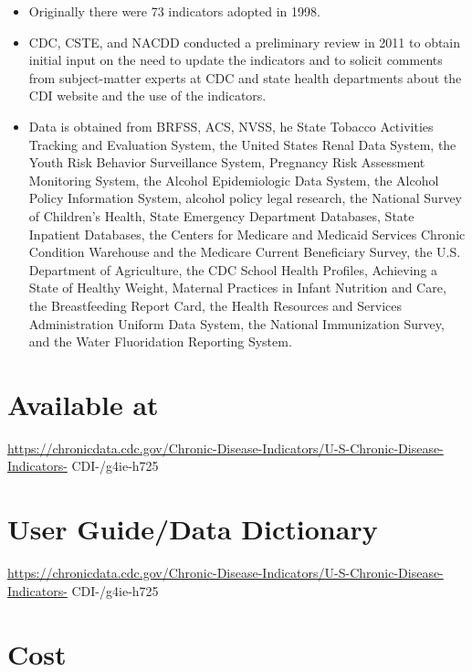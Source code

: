 \documentclass[
]{book}
\providecommand{\tightlist}{%
  \setlength{\itemsep}{0pt}\setlength{\parskip}{0pt}}
\begin{document}
\begin{itemize}
\tightlist
\item
  Originally there were 73 indicators adopted in 1998.
\item
  CDC, CSTE, and NACDD conducted a preliminary review in 2011 to obtain initial input on the need to update the indicators and to solicit comments from subject-matter experts at CDC and state health departments about the CDI website and the use of the indicators.
\item
  Data is obtained from BRFSS, ACS, NVSS, he State Tobacco Activities Tracking and Evaluation System, the United States Renal Data System, the Youth Risk Behavior Surveillance System, Pregnancy Risk Assessment Monitoring System, the Alcohol Epidemiologic Data System, the Alcohol Policy Information System, alcohol policy legal research, the National Survey of Children's Health, State Emergency Department Databases, State Inpatient Databases, the Centers for Medicare and Medicaid Services Chronic Condition Warehouse and the Medicare Current Beneficiary Survey, the U.S. Department of Agriculture, the CDC School Health Profiles, Achieving a State of Healthy Weight, Maternal Practices in Infant Nutrition and Care, the Breastfeeding Report Card, the Health Resources and Services Administration Uniform Data System, the National Immunization Survey, and the Water Fluoridation Reporting System.
\end{itemize}

\hypertarget{available-at-15}{%
\section{Available at}\label{available-at-15}}

\url{https://chronicdata.cdc.gov/Chronic-Disease-Indicators/U-S-Chronic-Disease-Indicators-} CDI-/g4ie-h725

\hypertarget{user-guidedata-dictionary-15}{%
\section{User Guide/Data Dictionary}\label{user-guidedata-dictionary-15}}

\url{https://chronicdata.cdc.gov/Chronic-Disease-Indicators/U-S-Chronic-Disease-Indicators-} CDI-/g4ie-h725

\hypertarget{cost-15}{%
\section{Cost}\label{cost-15}}
\end{document}
